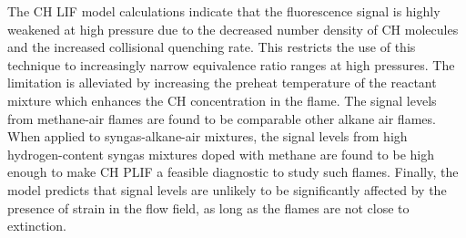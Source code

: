The CH LIF model calculations indicate that the fluorescence signal is highly weakened at high pressure due to the decreased number density of CH molecules and the increased collisional quenching rate.
This restricts the use of this technique to increasingly narrow equivalence ratio ranges at high pressures.
The limitation is alleviated by increasing the preheat temperature of the reactant mixture which enhances the CH concentration in the flame.
The signal levels from methane-air flames are found to be comparable other alkane air flames.
When applied to syngas-alkane-air mixtures, the signal levels from high hydrogen-content syngas mixtures doped with methane are found to be high enough to make CH PLIF a feasible diagnostic to study such flames.
Finally, the model predicts that signal levels are unlikely to be significantly affected by the presence of strain in the flow field, as long as the flames are not close to extinction.


